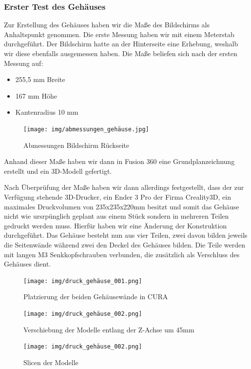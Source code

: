 \subsubsection{Erster Test des Gehäuses}\label{hw_case_ersterTest}
Zur Erstellung des Gehäuses haben wir die Maße des Bildschirms als Anhaltspunkt genommen. 
Die erste Messung haben wir mit einem Meterstab durchgeführt.
Der Bildschirm hatte an der Hinterseite eine Erhebung, weshalb wir diese ebenfalls ausgemessen haben. 
Die Maße beliefen sich nach der ersten Messung auf:
\begin{itemize}
	\item 255,5 mm Breite
	\item 167 mm Höhe
	\item Kantenradius 10 mm
\end{itemize}
\begin{figure}[H]
	\texttt{[image: img/abmessungen\_gehäuse.jpg]}
	\caption[Abmessungen Bildschirm Rückseite]{Abmessungen Bildschirm Rückseite}
	\label{fig:screen-back-01}
\end{figure}
\noindent Anhand dieser Maße haben wir dann in Fusion 360 eine Grundplanzeichnung erstellt und ein 3D-Modell gefertigt.\par	
\noindent Nach Überprüfung der Maße haben wir dann allerdings festgestellt, dass der zur Verfügung stehende 3D-Drucker, ein Ender 3 Pro der Firma Creality3D, ein maximales Druckvolumen von 235x235x220mm besitzt und somit das Gehäuse nicht wie ursrpünglich geplant aus einem Stück sondern in mehreren Teilen gedruckt werden muss. 
Hierfür haben wir eine Änderung der Konstruktion durchgeführt. 
Das Gehäuse besteht nun aus vier Teilen, zwei davon bilden jeweils die Seitenwände während zwei den Deckel des Gehäuses bilden. 
Die Teile werden mit langen M3 Senkkopfschrauben verbunden, die zusätzlich als Verschluss des Gehäuses dient.\par
\begin{figure}[H]
	\texttt{[image: img/druck\_gehäuse\_001.png]}
	\caption[Platzierung der beiden Gehäusewände in CURA]{Platzierung der beiden Gehäusewände in CURA}
	\label{fig:print-case-test_01}
\end{figure}
\begin{figure}[H]
	\texttt{[image: img/druck\_gehäuse\_002.png]}
	\caption[Verschiebung der Modelle entlang der Z-Achse um 45mm]{Verschiebung der Modelle entlang der Z-Achse um 45mm}
	\label{fig:print-case-test_02}
\end{figure}
\begin{figure}[H]
	\texttt{[image: img/druck\_gehäuse\_002.png]}
	\caption[Slicen der Modelle]{Slicen der Modelle}
	\label{fig:print-case-test_03}
\end{figure}
